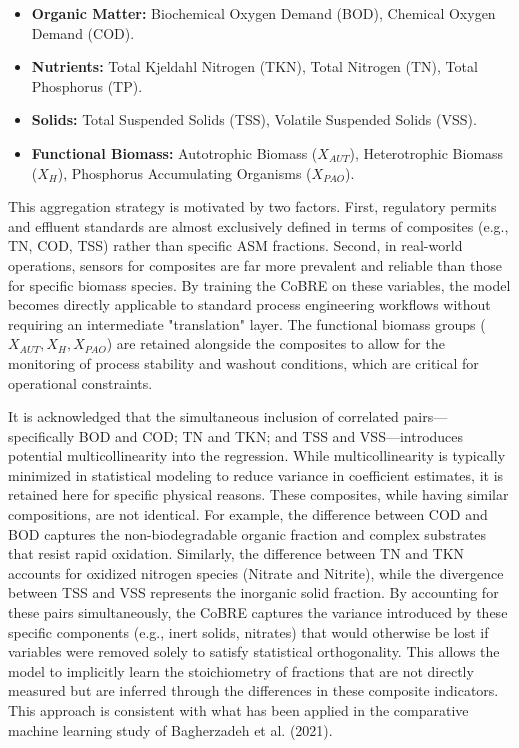 \documentclass{article}
\begin{document}
\begin{itemize}
    \item \textbf{Organic Matter:} Biochemical Oxygen Demand (BOD), Chemical Oxygen Demand (COD).
    \item \textbf{Nutrients:} Total Kjeldahl Nitrogen (TKN), Total Nitrogen (TN), Total Phosphorus (TP).
    \item \textbf{Solids:} Total Suspended Solids (TSS), Volatile Suspended Solids (VSS).
    \item \textbf{Functional Biomass:} Autotrophic Biomass ($X_{AUT}$), Heterotrophic Biomass ($X_{H}$), Phosphorus Accumulating Organisms ($X_{PAO}$).
\end{itemize}

This aggregation strategy is motivated by two factors. First, regulatory permits and effluent standards are almost exclusively defined in terms of composites (e.g., TN, COD, TSS) rather than specific ASM fractions. Second, in real-world operations, sensors for composites are far more prevalent and reliable than those for specific biomass species. By training the CoBRE on these variables, the model becomes directly applicable to standard process engineering workflows without requiring an intermediate "translation" layer. The functional biomass groups ($X_{AUT}, X_{H}, X_{PAO}$) are retained alongside the composites to allow for the monitoring of process stability and washout conditions, which are critical for operational constraints.

It is acknowledged that the simultaneous inclusion of correlated pairs—specifically BOD and COD; TN and TKN; and TSS and VSS—introduces potential multicollinearity into the regression. While multicollinearity is typically minimized in statistical modeling to reduce variance in coefficient estimates, it is retained here for specific physical reasons. These composites, while having similar compositions, are not identical. For example, the difference between COD and BOD captures the non-biodegradable organic fraction and complex substrates that resist rapid oxidation. Similarly, the difference between TN and TKN accounts for oxidized nitrogen species (Nitrate and Nitrite), while the divergence between TSS and VSS represents the inorganic solid fraction. By accounting for these pairs simultaneously, the CoBRE captures the variance introduced by these specific components (e.g., inert solids, nitrates) that would otherwise be lost if variables were removed solely to satisfy statistical orthogonality. This allows the model to implicitly learn the stoichiometry of fractions that are not directly measured but are inferred through the differences in these composite indicators. This approach is consistent with what has been applied in the comparative machine learning study of Bagherzadeh et al. (2021).
\end{document}
